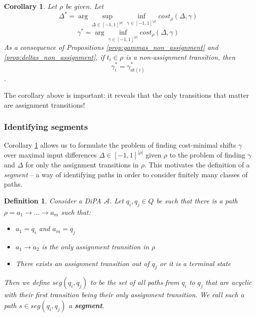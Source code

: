 \documentclass{article}
\newtheorem{corollary}{Corollary}[theorem]
\newtheorem{definition}{Definition}[section]
\newcommand{\1}{\langle 1 \rangle}
\newcommand{\2}{\langle 2 \rangle}
\begin{document}
\begin{corollary}
    \label{cor:non_assignment_solved}
    Let $\rho$ be given. Let \[\Delta^* = \arg \sup_{\Delta \in [-1, 1]^{|\rho|}} \inf_{\gamma \in [-1, 1]^{|\rho|}} cost_{\rho} (\Delta, \gamma)\]
    \[\gamma^* = \arg \inf_{\gamma \in [-1, 1]^{|\rho|}} cost_{\rho}(\Delta, \gamma)\]
    As a consequence of Propositions \ref{prop:gammas_non_assignment} and \ref{prop:deltas_non_assignment}, if $t_i \in \rho$ is a non-assignment transition, then \[\gamma_i^* = 
    \gamma^*_{at(i)}\].

\end{corollary}

The corollary above is important: it reveals that the only transitions that matter are assignment transitions!

\subsubsection{Identifying segments}

Corollary \ref{cor:non_assignment_solved} allows us to formulate the problem of finding cost-minimal shifts $\gamma$ over maximal input differences $\Delta \in [-1, 1]^{|\rho|}$ given $\rho$ to the problem of finding $\gamma$ and $\Delta$ for only the assignment transitions in $\rho$. This motivates the definition of a \textit{segment} -- a way of identifying paths in order to consider finitely many classes of paths.

\begin{definition}
    Consider a DiPA $\mathcal{A}$. Let $q_i, q_j \in Q$ be such that there is a path $\rho = a_1 \to \dots \to a_m$ such that:

    \begin{itemize}
        \item $a_1 = q_i$ and $a_m = q_j$
        \item $a_1 \to a_2$ is the only assignment transition in $\rho$
        \item There exists an assignment transition out of $q_j$ or it is a terminal state
    \end{itemize}

    Then we define $seg(q_i, q_j)$ to be the set of all paths from $q_i$ to $q_j$ that are acyclic with their first transition being their only assignment transition. We call such a path $s \in seg(q_i, q_j)$ a \textbf{segment}. 
\end{definition}
\end{document}
